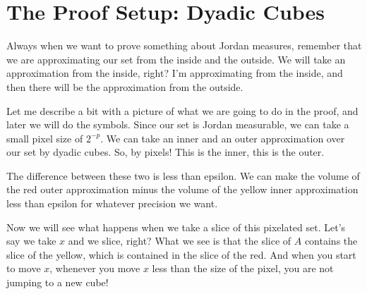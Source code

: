 \section{The Proof Setup: Dyadic Cubes}

\begin{spoken-clean}[00:07:30 - 00:11:00]
Always when we want to prove something about Jordan measures, remember that we are approximating our set from the inside and the outside. We will take an approximation from the inside, right? I'm approximating from the inside, and then there will be the approximation from the outside. 

Let me describe a bit with a picture of what we are going to do in the proof, and later we will do the symbols. Since our set is Jordan measurable, we can take a small pixel size of $2^{-p}$. We can take an inner and an outer approximation over our set by dyadic cubes. So, by pixels! This is the inner, this is the outer. 

The difference between these two is less than epsilon. We can make the volume of the red outer approximation minus the volume of the yellow inner approximation less than epsilon for whatever precision we want. 

Now we will see what happens when we take a slice of this pixelated set. Let's say we take $x$ and we slice, right? What we see is that the slice of $A$ contains the slice of the yellow, which is contained in the slice of the red. And when you start to move $x$, whenever you move $x$ less than the size of the pixel, you are not jumping to a new cube!
\end{spoken-clean}

